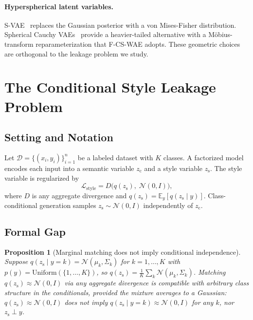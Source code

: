 \documentclass[10pt,letterpaper]{article}
\newcommand{\ours}{F-CS-WAE}
\newcommand{\zc}{z_{\mathrm{c}}}
\newcommand{\zs}{z_{\mathrm{s}}}
\newtheorem{proposition}{Proposition}
\begin{document}
\paragraph{Hyperspherical latent variables.}
S-VAE~\citep{davidson2018hyperspherical} replaces the Gaussian posterior
with a von Mises-Fisher distribution. Spherical Cauchy
VAEs~\citep{sablica2025hyperspherical} provide a heavier-tailed alternative
with a M\"obius-transform reparameterization that \ours{} adopts. These
geometric choices are orthogonal to the leakage problem we study.

\section{The Conditional Style Leakage Problem}
\label{sec:phenomenon}

\subsection{Setting and Notation}

Let $\mathcal{D}=\{(x_i,y_i)\}_{i=1}^n$ be a labeled dataset with $K$ classes.
A factorized model encodes each input into a semantic variable $\zc$ and a
style variable $\zs$. The style variable is regularized by
\begin{equation}
  \mathcal{L}_{\mathrm{style}} = D\!\bigl(q(\zs),\;\mathcal{N}(0,I)\bigr),
  \label{eq:generic-style-reg}
\end{equation}
where $D$ is any aggregate divergence and $q(\zs)=\mathbb{E}_y[q(\zs\mid y)]$.
Class-conditional generation samples $\zs\sim\mathcal{N}(0,I)$ independently
of $\zc$.

\subsection{Formal Gap}
\label{sec:formal-gap}

\begin{proposition}[Marginal matching does not imply conditional independence]
\label{prop:marginal-not-sufficient}
Suppose $q(\zs\mid y{=}k)=\mathcal{N}(\mu_k,\Sigma_k)$ for $k=1,\dots,K$ with
$p(y)=\mathrm{Uniform}(\{1,\dots,K\})$, so
$q(\zs)=\frac{1}{K}\sum_k \mathcal{N}(\mu_k,\Sigma_k)$. Matching
$q(\zs)\approx\mathcal{N}(0,I)$ via any aggregate divergence is compatible
with \emph{arbitrary} class structure in the conditionals, provided the
mixture averages to a Gaussian: $q(\zs)\approx\mathcal{N}(0,I)$ does not
imply $q(\zs\mid y{=}k)\approx\mathcal{N}(0,I)$ for any $k$, nor
$\zs\perp y$.
\end{proposition}
\end{document}
